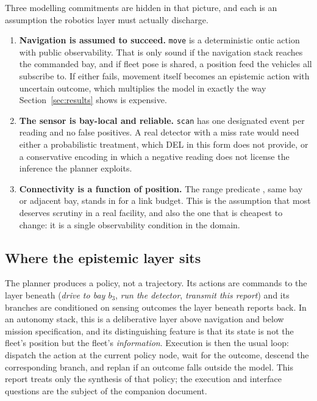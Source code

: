 \documentclass[11pt,a4paper]{article}
\theoremstyle{definition}
\begin{document}
Three modelling commitments are hidden in that picture, and each is an
assumption the robotics layer must actually discharge.

\begin{enumerate}[leftmargin=1.4em, itemsep=2pt]
\item \textbf{Navigation is assumed to succeed.} \texttt{move} is a
deterministic ontic action with public observability. That is only sound if the
navigation stack reaches the commanded bay, and if fleet pose is shared, a
position feed the vehicles all subscribe to. If either fails, movement itself
becomes an epistemic action with uncertain outcome, which multiplies the model
in exactly the way Section~\ref{sec:results} shows is expensive.
\item \textbf{The sensor is bay-local and reliable.} \texttt{scan} has one
designated event per reading and no false positives. A real detector with a
miss rate would need either a probabilistic treatment, which DEL in this form
does not provide, or a conservative encoding in which a negative reading does
not license the inference the planner exploits.
\item \textbf{Connectivity is a function of position.} The range predicate , 
same bay or adjacent bay, stands in for a link budget. This is the
assumption that most deserves scrutiny in a real facility, and also the one
that is cheapest to change: it is a single observability condition in the
domain.
\end{enumerate}

\subsection{Where the epistemic layer sits}

The planner produces a policy, not a trajectory. Its actions are commands to
the layer beneath (\emph{drive to bay $b_3$}, \emph{run the detector},
\emph{transmit this report}) and its branches are conditioned on sensing
outcomes the layer beneath reports back. In an autonomy stack, this is a
deliberative layer above navigation and below mission specification, and its
distinguishing feature is that its state is not the fleet's position but the
fleet's \emph{information}. Execution is then the usual loop: dispatch the
action at the current policy node, wait for the outcome, descend the
corresponding branch, and replan if an outcome falls outside the model. This
report treats only the synthesis of that policy; the execution and interface
questions are the subject of the companion document.
\end{document}
